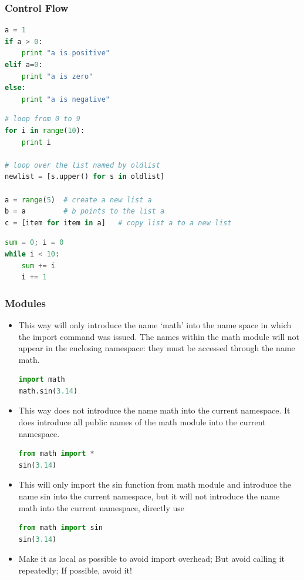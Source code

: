 \begin{frame}[fragile]
  \MyLogo
  \frametitle{Control Flow}  
\small

\medskip
{}
\begin{lstlisting}[language=python]
a = 1
if a > 0:
	print "a is positive"
elif a=0:
	print "a is zero"
else:
	print "a is negative"
\end{lstlisting}			

\begin{lstlisting}[language=python]
# loop from 0 to 9
for i in range(10):
	print i
	
# loop over the list named by oldlist
newlist = [s.upper() for s in oldlist]

a = range(5)  # create a new list a
b = a         # b points to the list a
c = [item for item in a]   # copy list a to a new list
\end{lstlisting}	
	
\begin{lstlisting}[language=python]
sum = 0; i = 0
while i < 10:
	sum += i
	i += 1
\end{lstlisting}

\end{frame}


\begin{frame}[fragile]
  \MyLogo
  \frametitle{Modules}  
\small		

\begin{itemize}
\item This way will only introduce the name `math' into the name space in which the import command was issued. The names within the math module will not appear in the enclosing namespace: they must be accessed through the name math.
\begin{lstlisting}[language=python,numbers=none] 
import math
math.sin(3.14)
\end{lstlisting}

\item This way does not introduce the name math into the current namespace. It does  introduce all public names of the math module into the current namespace.\begin{lstlisting}[language=python,numbers=none] 
from math import *
sin(3.14)
\end{lstlisting}

\item This will only import the sin function from math module and introduce the name sin into the current namespace, but it will not introduce the name math into the current namespace, directly use
\begin{lstlisting}[language=python,numbers=none] 
from math import sin
sin(3.14)
\end{lstlisting}

\item Make it as local as possible to avoid import overhead; But avoid calling it repeatedly; If possible, avoid it!
\end{itemize}

\end{frame}

